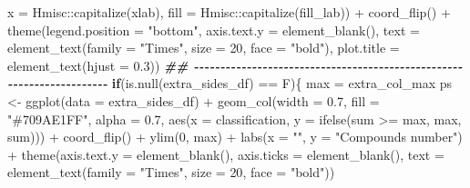 \documentclass[
]{article}
\newenvironment{Shaded}{\begin{snugshade}}{\end{snugshade}}
\newcommand{\AttributeTok}[1]{\textcolor[rgb]{0.77,0.63,0.00}{#1}}
\newcommand{\ControlFlowTok}[1]{\textcolor[rgb]{0.13,0.29,0.53}{\textbf{#1}}}
\newcommand{\DecValTok}[1]{\textcolor[rgb]{0.00,0.00,0.81}{#1}}
\newcommand{\DocumentationTok}[1]{\textcolor[rgb]{0.56,0.35,0.01}{\textbf{\textit{#1}}}}
\newcommand{\FloatTok}[1]{\textcolor[rgb]{0.00,0.00,0.81}{#1}}
\newcommand{\FunctionTok}[1]{\textcolor[rgb]{0.00,0.00,0.00}{#1}}
\newcommand{\NormalTok}[1]{#1}
\newcommand{\OtherTok}[1]{\textcolor[rgb]{0.56,0.35,0.01}{#1}}
\newcommand{\SpecialCharTok}[1]{\textcolor[rgb]{0.00,0.00,0.00}{#1}}
\newcommand{\StringTok}[1]{\textcolor[rgb]{0.31,0.60,0.02}{#1}}
\begin{document}
\begin{Shaded}
\begin{Highlighting}[]
           \AttributeTok{x =}\NormalTok{ Hmisc}\SpecialCharTok{::}\FunctionTok{capitalize}\NormalTok{(xlab),}
           \AttributeTok{fill =}\NormalTok{ Hmisc}\SpecialCharTok{::}\FunctionTok{capitalize}\NormalTok{(fill\_lab)) }\SpecialCharTok{+}
      \FunctionTok{coord\_flip}\NormalTok{() }\SpecialCharTok{+}
      \FunctionTok{theme}\NormalTok{(}\AttributeTok{legend.position =} \StringTok{"bottom"}\NormalTok{,}
            \AttributeTok{axis.text.y =} \FunctionTok{element\_blank}\NormalTok{(),}
            \AttributeTok{text =} \FunctionTok{element\_text}\NormalTok{(}\AttributeTok{family =} \StringTok{"Times"}\NormalTok{, }\AttributeTok{size =} \DecValTok{20}\NormalTok{, }\AttributeTok{face =} \StringTok{"bold"}\NormalTok{),}
            \AttributeTok{plot.title =} \FunctionTok{element\_text}\NormalTok{(}\AttributeTok{hjust =} \FloatTok{0.3}\NormalTok{))}
    \DocumentationTok{\#\# {-}{-}{-}{-}{-}{-}{-}{-}{-}{-}{-}{-}{-}{-}{-}{-}{-}{-}{-}{-}{-}{-}{-}{-}{-}{-}{-}{-}{-}{-}{-}{-}{-}{-}{-}{-}{-}{-}{-}{-}{-}{-}{-}{-}{-}{-}{-}{-}{-}{-}{-}{-}{-}{-}{-}{-}{-}{-}{-}{-}{-}{-}{-}{-}{-}{-}{-}{-}{-}{-} }
    \ControlFlowTok{if}\NormalTok{(}\FunctionTok{is.null}\NormalTok{(extra\_sides\_df) }\SpecialCharTok{==}\NormalTok{ F)\{}
\NormalTok{      max }\OtherTok{=}\NormalTok{ extra\_col\_max}
\NormalTok{      ps }\OtherTok{\textless{}{-}} \FunctionTok{ggplot}\NormalTok{(}\AttributeTok{data =}\NormalTok{ extra\_sides\_df) }\SpecialCharTok{+}
        \FunctionTok{geom\_col}\NormalTok{(}\AttributeTok{width =} \FloatTok{0.7}\NormalTok{,}
                 \AttributeTok{fill =} \StringTok{"\#709AE1FF"}\NormalTok{,}
                 \AttributeTok{alpha =} \FloatTok{0.7}\NormalTok{,}
                 \FunctionTok{aes}\NormalTok{(}\AttributeTok{x =}\NormalTok{ classification, }\AttributeTok{y =} \FunctionTok{ifelse}\NormalTok{(sum }\SpecialCharTok{\textgreater{}=}\NormalTok{ max, max, sum))) }\SpecialCharTok{+}
        \FunctionTok{coord\_flip}\NormalTok{() }\SpecialCharTok{+}
        \FunctionTok{ylim}\NormalTok{(}\DecValTok{0}\NormalTok{, max) }\SpecialCharTok{+}
        \FunctionTok{labs}\NormalTok{(}\AttributeTok{x =} \StringTok{""}\NormalTok{, }\AttributeTok{y =} \StringTok{"Compounds number"}\NormalTok{) }\SpecialCharTok{+}
        \FunctionTok{theme}\NormalTok{(}\AttributeTok{axis.text.y =} \FunctionTok{element\_blank}\NormalTok{(),}
              \AttributeTok{axis.ticks =} \FunctionTok{element\_blank}\NormalTok{(),}
              \AttributeTok{text =} \FunctionTok{element\_text}\NormalTok{(}\AttributeTok{family =} \StringTok{"Times"}\NormalTok{, }\AttributeTok{size =} \DecValTok{20}\NormalTok{, }\AttributeTok{face =} \StringTok{"bold"}\NormalTok{))}

\end{Highlighting}
\end{Shaded}
\end{document}
